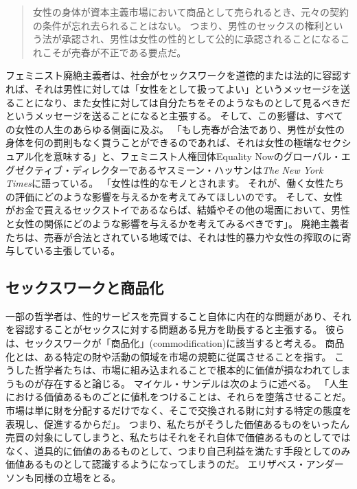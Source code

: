 \documentclass[paper=a4,book,openany]{jlreq} \usepackage{mystyle}
\begin{document}
\begin{quote}
女性の身体が資本主義市場において商品として売られるとき、元々の契約の条件が忘れ去られることはない。
つまり、男性のセックスの権利という法が承認され、男性は女性の性的として公的に承認されることになる{\DDASH}これこそが売春が不正である要点だ。
\citep[p.208]{pateman88:_sexual_contr}
\end{quote}

フェミニスト廃絶主義者は、社会がセックスワークを道徳的または法的に容認すれば、それは男性に対しては「女性をとして扱ってよい」というメッセージを送ることになり、また女性に対しては自分たちをそのようなものとして見るべきだというメッセージを送ることになると主張する。
そして、この影響は、すべての女性の人生のあらゆる側面に及ぶ。
「もし売春が合法であり、男性が女性の身体を何の罰則もなく買うことができるのであれば、それは女性の極端なセクシュアル化を意味する」と、フェミニスト人権団体Equality Nowのグローバル・エグゼクティブ・ディレクターであるヤスミーン・ハッサンは\emph{The New York Times}に語っている。
「女性は性的なモノとされます。
それが、働く女性たちの評価にどのような影響を与えるかを考えてみてほしいのです。
そして、女性がお金で買えるセックストイであるならば、結婚やその他の場面において、男性と女性の関係にどのような影響を与えるかを考えてみるべきです」\citep{bazelon16:_shoul_prost_be_crime}。
廃絶主義者たちは、売春が合法とされている地域では、それは性的暴力や女性の搾取のに寄与している主張している\citep[p.3]{waltman10:_prohib_purch_sex_sweden}。

\subsection{セックスワークと商品化}

一部の哲学者は、性的サービスを売買すること自体に内在的な問題があり、それを容認することがセックスに対する問題ある見方を助長すると主張する。
彼らは、セックスワークが「商品化」(commodification)に該当すると考える。
商品化とは、ある特定の財や活動の領域を市場の規範に従属させることを指す。
こうした哲学者たちは、市場に組み込まれることで根本的に価値が損なわれてしまうものが存在すると論じる。
マイケル・サンデルは次のように述べる。
「人生における価値あるものごとに値札をつけることは、それらを堕落させることだ。
市場は単に財を分配するだけでなく、そこで交換される財に対する特定の態度を表現し、促進するからだ」\citep[p.9]{sandel12:money_cant_buy}。
つまり、私たちがそうした価値あるものをいったん売買の対象にしてしまうと、私たちはそれをそれ自体で価値あるものとしてではなく、道具的に価値のあるものとして、つまり自己利益を満たす手段としてのみ価値あるものとして認識するようになってしまうのだ。
エリザベス・アンダーソンも同様の立場をとる。
\end{document}
